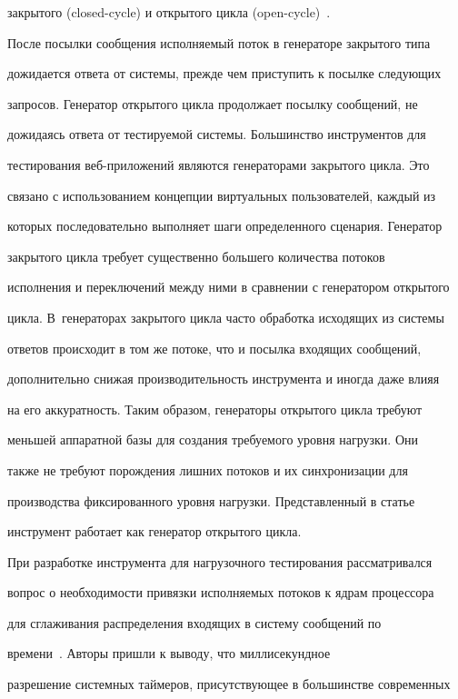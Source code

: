 закрытого (closed-cycle) и открытого цикла (open-cycle)~\cite{11-g}.


После посылки сообщения исполняемый поток в генераторе закрытого типа


дожидается ответа от сис\-те\-мы, прежде чем приступить к посылке сле\-ду\-ющих


запросов. Генератор открытого цик\-ла продолжает посылку сообщений, не


дожидаясь ответа от тестируемой сис\-те\-мы. Большинство инструментов для


тестирования веб-при\-ло\-же\-ний являются генераторами закрытого цик\-ла. Это


связано с использованием концепции виртуальных пользователей, каждый из


которых последовательно выполняет шаги определенного сценария. Генератор


закрытого цикла требует существенно большего количества потоков


исполнения и переключений между ними в сравнении с генератором открытого


цикла. В~генераторах закрытого цикла часто обработка исходящих из системы


ответов происходит в том же потоке, что и посылка входящих сообщений,


дополнительно снижая производительность инструмента и иногда даже влияя


на его аккуратность. Таким образом, генераторы открытого цикла требуют


меньшей аппаратной базы для создания требуемого уровня нагрузки. Они


также не требуют порождения лишних потоков и их синхронизации для


производства фиксированного уровня нагрузки. Пред\-став\-лен\-ный в статье


инструмент работает как генератор открытого цикла.





  При разработке инструмента для нагрузочного тестирования рассматривался


вопрос о необходимости привязки исполняемых потоков к ядрам процессора


для сглаживания распределения входящих в систему сообщений по


времени~\cite{12-g}. Авторы пришли к выводу, что миллисекундное


разрешение системных таймеров, присутствующее в большинстве современных


